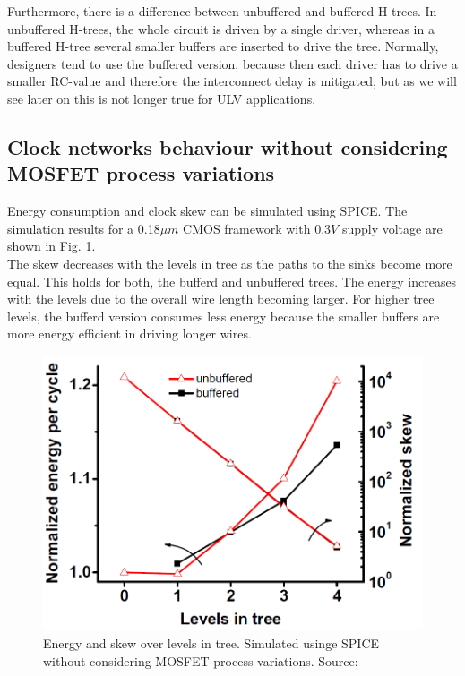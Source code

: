 \documentclass[conference]{IEEEtran}
\begin{document}
Furthermore, there is a difference between unbuffered and buffered H-trees. In unbuffered H-trees, the whole circuit is driven by a single driver, whereas in a buffered H-tree several smaller buffers are inserted to drive the tree. Normally, designers tend to use the buffered version, because then each driver has to drive a smaller RC-value and therefore the interconnect delay is mitigated, but as we will see later on this is not longer true for ULV applications.

\subsection{Clock networks behaviour without considering MOSFET process variations}
Energy consumption and clock skew can be simulated using SPICE. The simulation results for a 0.18$\mu m$ CMOS framework with 0.3$V$ supply voltage are shown in Fig. \ref{fig:skew_energy_normal}.\\
The skew decreases with the levels in tree as the paths to the sinks become more equal. This holds for both, the bufferd and unbuffered trees. The energy increases with the levels due to the overall wire length becoming larger. For higher tree levels, the bufferd version consumes less energy because the smaller buffers are more energy efficient in driving longer wires.

\begin{figure}[htbp]
	\includegraphics[width=0.8\linewidth]{img/skew_energy_normal.png}
	\centering
	\caption{Energy and skew over levels in tree. Simulated usinge SPICE without considering MOSFET process variations. Source: \cite{b1}}
	\label{fig:skew_energy_normal}
\end{figure}
\end{document}
